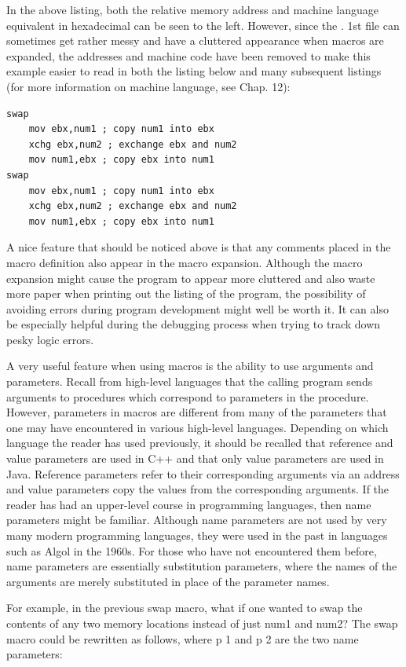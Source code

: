 \documentclass[10pt]{book}
\begin{document}
In the above listing, both the relative memory address and machine language equivalent in hexadecimal can be seen to the left. However, since the . 1st file can sometimes get rather messy and have a cluttered appearance when macros are expanded, the addresses and machine code have been removed to make this example easier to read in both the listing below and many subsequent listings (for more information on machine language, see Chap. 12):

\begin{verbatim}
swap
    mov ebx,num1 ; copy num1 into ebx
    xchg ebx,num2 ; exchange ebx and num2
    mov num1,ebx ; copy ebx into num1
swap
    mov ebx,num1 ; copy num1 into ebx
    xchg ebx,num2 ; exchange ebx and num2
    mov num1,ebx ; copy ebx into num1
\end{verbatim}

A nice feature that should be noticed above is that any comments placed in the macro definition also appear in the macro expansion. Although the macro expansion might cause the program to appear more cluttered and also waste more paper when printing out the listing of the program, the possibility of avoiding errors during program development might well be worth it. It can also be especially helpful during the debugging process when trying to track down pesky logic errors.

A very useful feature when using macros is the ability to use arguments and parameters. Recall from high-level languages that the calling program sends arguments to procedures which correspond to parameters in the procedure. However, parameters in macros are different from many of the parameters that one may have encountered in various high-level languages. Depending on which language the reader has used previously, it should be recalled that reference and value parameters are used in C++ and that only value parameters are used in Java. Reference parameters refer to their corresponding arguments via an address and value parameters copy the values from the corresponding arguments. If the reader has had an upper-level course in programming languages, then name parameters might be familiar. Although name parameters are not used by very many modern programming languages, they were used in the past in languages such as Algol in the 1960s. For those who have not encountered them before, name parameters are essentially substitution parameters, where the names of the arguments are merely substituted in place of the parameter names.

For example, in the previous swap macro, what if one wanted to swap the contents of any two memory locations instead of just num1 and num2? The swap macro could be rewritten as follows, where p 1 and p 2 are the two name parameters:
\end{document}
